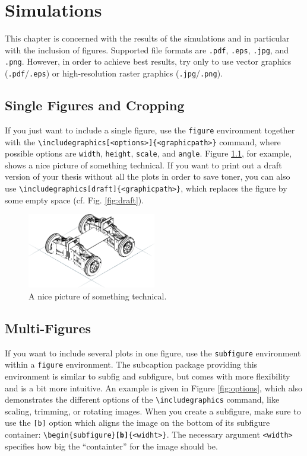 \chapter{Simulations}
This chapter is concerned with the results of the simulations and in particular with the inclusion of figures. Supported file formats are \texttt{.pdf}, \texttt{.eps}, \texttt{.jpg}, and \texttt{.png}. However, in order to achieve best results, try only to use vector graphics (\texttt{.pdf}/\texttt{.eps}) or high-resolution raster graphics (\texttt{.jpg}/\texttt{.png}).

\section{Single Figures and Cropping}
If you just want to include a single figure, use the \texttt{figure} environment together with the \texttt{\textbackslash includegraphics[<options>]\{<graphicpath>\}} command, where possible options are \texttt{width}, \texttt{height}, \texttt{scale}, and \texttt{angle}. Figure \ref{fig:trak}, for example, shows a nice picture of something technical. If you want to print out a draft version of your thesis without all the plots in order to save toner, you can also use \texttt{\textbackslash includegraphics[draft]\{<graphicpath>\}}, which replaces the figure by some empty space (cf. Fig. \ref{fig:draft}).

\begin{figure}
\centering
\includegraphics[width=0.5\textwidth]{figures/trak_skeleton}
\caption[Including an image with \texttt{\textbackslash includegraphics}]{A nice picture of something technical.}
\label{fig:trak}
\end{figure}

\section{Multi-Figures}
If you want to include several plots in one figure, use the \texttt{subfigure} environment within a \texttt{figure} environment. The subcaption package providing this environment is similar to subfig and subfigure, but comes with more flexibility and is a bit more intuitive. An example is given in Figure \ref{fig:options}, which also demonstrates the different options of the \texttt{\textbackslash includegraphics} command, like scaling, trimming, or rotating images. When you create a subfigure, make sure to use the \texttt{[b]} option which aligns the image on the bottom of its subfigure container: \texttt{\textbackslash begin\{subfigure\}\textbf{[b]}\{<widht>\}}. The necessary argument \texttt{<width>} specifies how big the ``containter'' for the image should be. 

